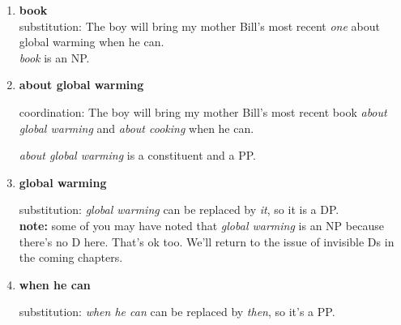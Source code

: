 \documentclass[a4paper,12pt]{article}
\begin{document}
\begin{enumerate}
\begin{enumerate}
      \item \textbf{book}\\
      substitution: The boy will bring my mother Bill's most recent \textit{one} about global warming when he can.\\
      \textit{book} is an NP.

      \item \textbf{about global warming}

      coordination: The boy will bring my mother Bill's most recent book \textit{about global warming} and \textit{about cooking} when he can.

      \textit{about global warming} is a constituent and a PP.

      \item\textbf{global warming}

      substitution: \textit{global warming} can be replaced by \textit{it}, so it is a DP.\\
      \textbf{note:} some of you may have noted that \textit{global warming} is an NP because there's no D here. That's ok too. We'll return to the issue of invisible Ds in the coming chapters.

      \item\textbf{when he can}

      substitution: \textit{when he can} can be replaced by \textit{then}, so it's a PP.

   \end{enumerate}
\end{enumerate}
\end{document}
